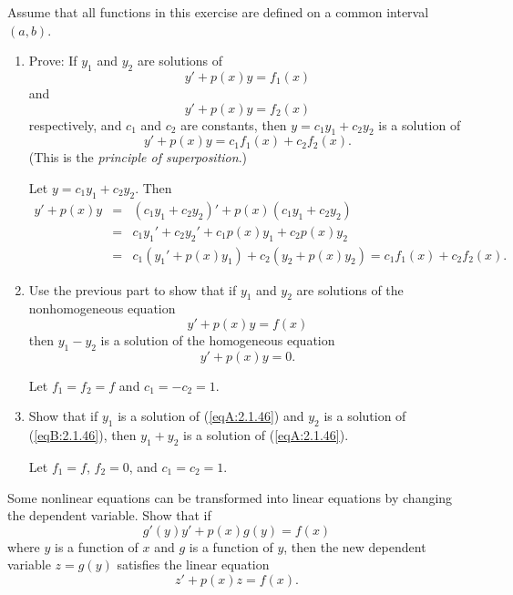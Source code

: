 \documentclass{ximera}
\begin{document}
\begin{problem}\label{exer:2.1.46}
Assume that all functions in this exercise are defined on
a common interval $(a,b)$.
\begin{enumerate}
\item %
Prove:  If $y_1$ and $y_2$ are solutions of
$$
y'+p(x)y=f_1(x)
$$
and
$$
y'+p(x)y=f_2(x)
$$
respectively, and $c_1$ and $c_2$ are constants, then
$y=c_1y_1+c_2y_2$ is a solution of
$$
y'+p(x)y=c_1f_1(x)+c_2f_2(x).
$$
(This is the \emph{principle of superposition}.)



\begin{solution}
    Let $y=c_1y_1+c_2y_2$. Then
\begin{eqnarray*}
y'+p(x)y&=&(c_1y_1+c_2y_2)'+p(x)(c_1y_1+c_2y_2)\\
&=&c_1y_1'+c_2y_2'+c_1p(x)y_1+c_2p(x)y_2\\
&=&c_1(y_1'+p(x)y_1)+c_2(y_2+p(x)y_2)=c_1f_1(x)+c_2f_2(x).
\end{eqnarray*}
\end{solution}

\item %
Use the previous part to show that if $y_1$ and $y_2$ are solutions
of the nonhomogeneous equation
\begin{equation}\label{eqA:2.1.46}
y'+p(x)y=f(x)
\end{equation}
then $y_1-y_2$ is a solution of the homogeneous equation
\begin{equation}\label{eqB:2.1.46}
y'+p(x)y=0.
\end{equation}



\begin{solution}
    Let $f_1=f_2=f$ and $c_1=-c_2=1$.
\end{solution}

\item %
Show that if $y_1$ is a solution of
(\ref{eqA:2.1.46}) and $y_2$ is a solution of
(\ref{eqB:2.1.46}), then $y_1+y_2$ is a solution of
(\ref{eqA:2.1.46}).



\begin{solution}
    Let $f_1=f$, $f_2=0$, and $c_1=c_2=1$.
\end{solution}
\end{enumerate}
\end{problem}

\begin{problem}\label{exer:2.1.47}
Some nonlinear equations can be transformed into linear
equations by changing the dependent variable.  Show that if
$$
g'(y)y'+p(x)g(y)=f(x)
$$
where $y$ is a function of $x$ and $g$ is a function of $y$,
then the new dependent variable $z=g(y)$ satisfies the
linear equation
$$
z'+p(x)z=f(x).
$$
\end{problem}
\end{document}
